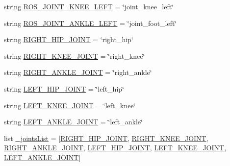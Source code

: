 \begin{DoxyCompactItemize}
string \mbox{\hyperlink{namespacepedal__simulation__old__trajectory_a00c9a4fb79f7b953ffa0563756afb51c}{R\+O\+S\+\_\+\+J\+O\+I\+N\+T\+\_\+\+K\+N\+E\+E\+\_\+\+L\+E\+FT}} = \char`\"{}joint\+\_\+knee\+\_\+left\char`\"{}
\item 
string \mbox{\hyperlink{namespacepedal__simulation__old__trajectory_a8833cdf601afabc570b698899c5e7ea3}{R\+O\+S\+\_\+\+J\+O\+I\+N\+T\+\_\+\+A\+N\+K\+L\+E\+\_\+\+L\+E\+FT}} = \char`\"{}joint\+\_\+foot\+\_\+left\char`\"{}
\item 
string \mbox{\hyperlink{namespacepedal__simulation__old__trajectory_a45555494a8ba7257007378bde5d4906c}{R\+I\+G\+H\+T\+\_\+\+H\+I\+P\+\_\+\+J\+O\+I\+NT}} = \char`\"{}right\+\_\+hip\char`\"{}
\item 
string \mbox{\hyperlink{namespacepedal__simulation__old__trajectory_aa908d35e0dc85aa87697f779a86e5ddb}{R\+I\+G\+H\+T\+\_\+\+K\+N\+E\+E\+\_\+\+J\+O\+I\+NT}} = \char`\"{}right\+\_\+knee\char`\"{}
\item 
string \mbox{\hyperlink{namespacepedal__simulation__old__trajectory_a43963d7b8b0fcedc7ca690b9f4ab56f6}{R\+I\+G\+H\+T\+\_\+\+A\+N\+K\+L\+E\+\_\+\+J\+O\+I\+NT}} = \char`\"{}right\+\_\+ankle\char`\"{}
\item 
string \mbox{\hyperlink{namespacepedal__simulation__old__trajectory_a8b364d052f2478b3fa5d68e06430ef30}{L\+E\+F\+T\+\_\+\+H\+I\+P\+\_\+\+J\+O\+I\+NT}} = \char`\"{}left\+\_\+hip\char`\"{}
\item 
string \mbox{\hyperlink{namespacepedal__simulation__old__trajectory_acb03f3ae5417f2e45e878ed1e6be2d61}{L\+E\+F\+T\+\_\+\+K\+N\+E\+E\+\_\+\+J\+O\+I\+NT}} = \char`\"{}left\+\_\+knee\char`\"{}
\item 
string \mbox{\hyperlink{namespacepedal__simulation__old__trajectory_a391213709fbaef5a2325c1ab5da37822}{L\+E\+F\+T\+\_\+\+A\+N\+K\+L\+E\+\_\+\+J\+O\+I\+NT}} = \char`\"{}left\+\_\+ankle\char`\"{}
\item 
list \mbox{\hyperlink{namespacepedal__simulation__old__trajectory_a14f4c13608354cf65ae83f5f7df39cf3}{\+\_\+joints\+List}} = \mbox{[}\mbox{\hyperlink{namespacepedal__simulation__old__trajectory_a45555494a8ba7257007378bde5d4906c}{R\+I\+G\+H\+T\+\_\+\+H\+I\+P\+\_\+\+J\+O\+I\+NT}}, \mbox{\hyperlink{namespacepedal__simulation__old__trajectory_aa908d35e0dc85aa87697f779a86e5ddb}{R\+I\+G\+H\+T\+\_\+\+K\+N\+E\+E\+\_\+\+J\+O\+I\+NT}}, \mbox{\hyperlink{namespacepedal__simulation__old__trajectory_a43963d7b8b0fcedc7ca690b9f4ab56f6}{R\+I\+G\+H\+T\+\_\+\+A\+N\+K\+L\+E\+\_\+\+J\+O\+I\+NT}}, \mbox{\hyperlink{namespacepedal__simulation__old__trajectory_a8b364d052f2478b3fa5d68e06430ef30}{L\+E\+F\+T\+\_\+\+H\+I\+P\+\_\+\+J\+O\+I\+NT}}, \mbox{\hyperlink{namespacepedal__simulation__old__trajectory_acb03f3ae5417f2e45e878ed1e6be2d61}{L\+E\+F\+T\+\_\+\+K\+N\+E\+E\+\_\+\+J\+O\+I\+NT}}, \mbox{\hyperlink{namespacepedal__simulation__old__trajectory_a391213709fbaef5a2325c1ab5da37822}{L\+E\+F\+T\+\_\+\+A\+N\+K\+L\+E\+\_\+\+J\+O\+I\+NT}}\mbox{]}

\end{DoxyCompactItemize}
